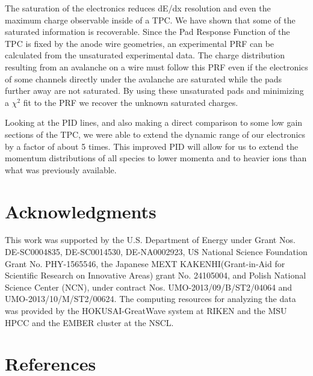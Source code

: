 \documentclass[review]{elsarticle}
\begin{document}
The saturation  of the electronics reduces dE/dx resolution and even the maximum charge observable inside of a TPC.  We have shown that some of the saturated information is recoverable. Since the Pad Response Function of the TPC is fixed by the anode wire geometries, an experimental PRF can be calculated from the unsaturated experimental data. The charge distribution resulting from an avalanche on a wire must follow this PRF even if the electronics of some channels directly under the avalanche are saturated while the pads further away are not saturated. By using these unsaturated pads and minimizing a $\chi^2$ fit  to the PRF we recover the unknown saturated charges. 

Looking at the PID lines, and also making a direct comparison to some low gain sections of the TPC, we were able to extend the dynamic range of our electronics by a factor of about 5 times. This improved PID will allow for us to extend the momentum distributions of all species to lower momenta and to heavier ions than what was previously available. 


\section{Acknowledgments}
This work was supported by the U.S. Department of Energy under Grant Nos.  DE-SC0004835,  DE-SC0014530, DE-NA0002923,  US  National Science Foundation Grant  No.  PHY-1565546, the  Japanese  MEXT  KAKENHI(Grant-in-Aid  for  Scientific  Research  on  Innovative  Areas)  grant  No. 24105004, and Polish National Science Center (NCN), under contract Nos. UMO-2013/09/B/ST2/04064 and UMO-2013/10/M/ST2/00624. The computing resources for analyzing the data was provided by the HOKUSAI-GreatWave system at RIKEN and the MSU HPCC and the EMBER cluster at the NSCL. 

\section*{References}


\end{document}
